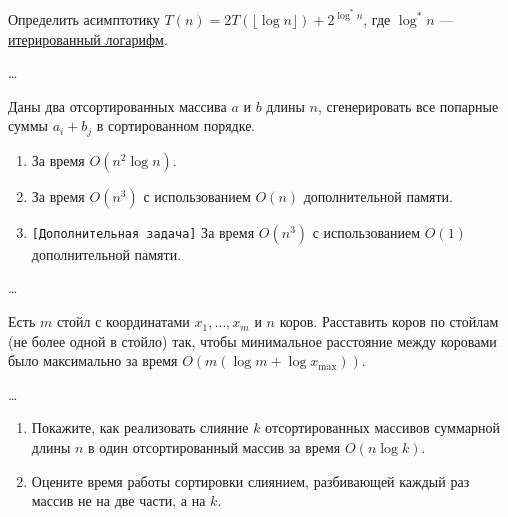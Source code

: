 
\begin{problem}
    Определить асимптотику $T(n) = 2T(\lfloor \log n \rfloor) + 2^{\log^* n}$, где $\log^* n$ ---
    \href{https://en.wikipedia.org/wiki/Iterated_logarithm}{итерированный логарифм}.
\end{problem}

\begin{solution}
    \dots
\end{solution}


\begin{problem}
    Даны два отсортированных массива $a$ и $b$ длины $n$, сгенерировать все попарные суммы $a_i + b_j$
    в сортированном порядке.
    \begin{enumerate}
        \item За время $O(n^2 \log n)$.
        \item За время $O(n^3)$ с использованием $O(n)$ дополнительной памяти.
        \item \texttt{[Дополнительная задача]} За время $O(n^3)$ с использованием $O(1)$ дополнительной памяти.
    \end{enumerate}
\end{problem}

\begin{solution}
    \dots
\end{solution}


\begin{problem}
    Есть $m$ стойл с координатами $x_1, \ldots, x_m$ и $n$ коров. Расставить коров по стойлам (не более одной в стойло) так,
    чтобы минимальное расстояние между коровами было максимально за время $O(m (\log{m} + \log{x_{\max}}))$.
\end{problem}

\begin{solution}
    \dots
\end{solution}


\begin{problem}
    \begin{enumerate}
        \item Покажите, как реализовать слияние $k$ отсортированных массивов суммарной длины $n$ в один отсортированный массив за время $O(n \log k)$.
        \item Оцените время работы сортировки слиянием, разбивающей каждый раз массив не на две части, а на $k$.
    \end{enumerate}
\end{problem}

